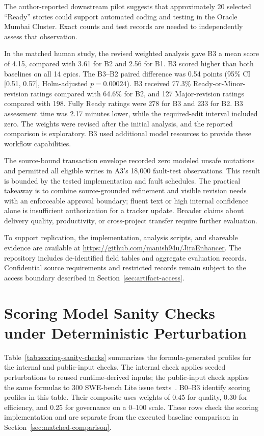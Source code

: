 \documentclass[pdflatex,sn-basic]{sn-jnl}
\begin{document}
The author-reported downstream pilot suggests that approximately 20 selected ``Ready'' stories could support automated coding and testing in the Oracle Mumbai Cluster. Exact counts and test records are needed to independently assess that observation.

In the matched human study, the revised weighted analysis gave B3 a mean score of 4.15, compared with 3.61 for B2 and 2.56 for B1. B3 scored higher than both baselines on all 14 epics. The B3--B2 paired difference was 0.54 points (95\% CI [0.51, 0.57], Holm-adjusted $p=0.00024$). B3 received 77.3\% Ready-or-Minor-revision ratings compared with 64.6\% for B2, and 127 Major-revision ratings compared with 198. Fully Ready ratings were 278 for B3 and 233 for B2. B3 assessment time was 2.17 minutes lower, while the required-edit interval included zero. The weights were revised after the initial analysis, and the reported comparison is exploratory. B3 used additional model resources to provide these workflow capabilities.

The source-bound transaction envelope recorded zero modeled unsafe mutations and permitted all eligible writes in A3's 18,000 fault-test observations. This result is bounded by the tested implementation and fault schedules. The practical takeaway is to combine source-grounded refinement and visible revision needs with an enforceable approval boundary; fluent text or high internal confidence alone is insufficient authorization for a tracker update. Broader claims about delivery quality, productivity, or cross-project transfer require further evaluation.

To support replication, the implementation, analysis scripts, and shareable evidence are available at \url{https://github.com/manish94u/JiraEnhancer}. The repository includes de-identified field tables and aggregate evaluation records. Confidential source requirements and restricted records remain subject to the access boundary described in Section~\ref{sec:artifact-access}.

\clearpage
\appendix
\section{Scoring Model Sanity Checks under Deterministic Perturbation}\label{sec:stress-testing}
Table~\ref{tab:scoring-sanity-checks} summarizes the formula-generated profiles for the internal and public-input checks. The internal check applies seeded perturbations to reused runtime-derived inputs; the public-input check applies the same formulas to 300 SWE-bench Lite issue texts~\citep{R26}. B0--B3 identify scoring profiles in this table. Their composite uses weights of 0.45 for quality, 0.30 for efficiency, and 0.25 for governance on a 0--100 scale. These rows check the scoring implementation and are separate from the executed baseline comparison in Section~\ref{sec:matched-comparison}.
\end{document}
